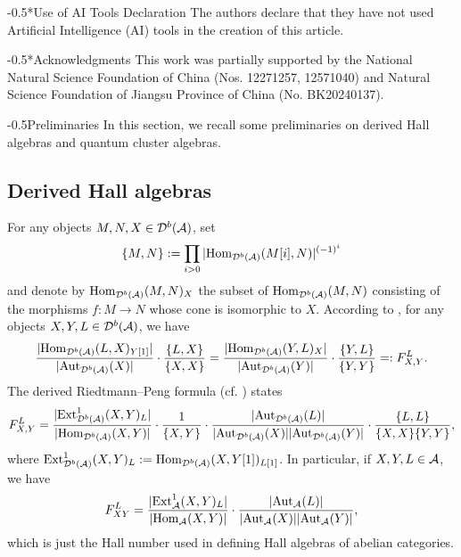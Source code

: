 \documentclass[reqno,12pt]{amsart}
\makeatletter
\numberwithin{equation}{section}
\def\Ext{\mbox{\rm Ext}} \def\Hom{\mbox{\rm Hom}} \def\dim{\mbox{\rm dim}} \def\Iso{\mbox{\rm Iso}\,}\def\Ind{\mbox{\rm Ind}\,}
\theoremstyle{plain} %
\theoremstyle{definition} %
\renewcommand{\section}{\@startsection{section}{1}{0mm}
  {-\baselineskip}{0.5\baselineskip}{\bf\leftline}}
\makeatother
\begin{document}
\section*{Use of AI Tools Declaration}
The authors declare that they have not used Artificial Intelligence (AI) tools in the creation of this article.

\section*{Acknowledgments}
This work was partially supported by the National Natural Science Foundation of China (Nos. 12271257, 12571040) and Natural Science Foundation of Jiangsu Province of China (No. BK20240137).



\section{Preliminaries}
In this section, we recall some preliminaries on derived Hall algebras and quantum cluster algebras.
\subsection{Derived Hall algebras}
For any objects $M,N, X\in \mathcal{D}^b(\mathcal{A})$, set $$\{M,N\}:=\prod\limits_{i>0}|\Hom_{\mathcal{D}^b(\A)}(M[i],N)|^{(-1)^i}$$ and denote by $\Hom_{\mathcal{D}^b(\A)}(M,N)_X$ the subset of $\Hom_{\mathcal{D}^b(\A)}(M,N)$ consisting of the morphisms $f: M\to N$ whose cone is isomorphic to $X$. According to \cite{Toen2006,XiaoXu}, for any objects $X,Y,L\in \mathcal{D}^b(\mathcal{A})$, we have
$$\frac{|\Hom_{\mathcal{D}^b(\A)}(L,X)_{Y[1]}|}{|{\rm Aut}_{\mathcal{D}^b(\A)}(X)|}\cdot\frac{\{L,X\}}{\{X,X\}}=
\frac{|\Hom_{\mathcal{D}^b(\A)}(Y,L)_{X}|}{|{\rm Aut}_{\mathcal{D}^b(\A)}(Y)|}\cdot\frac{\{Y,L\}}{\{Y,Y\}}=:F_{X,Y}^L.$$
The derived Riedtmann--Peng formula (cf. \cite{XiaoXu2,WWZ}) states
\begin{equation*}
F_{X,Y}^L=\frac{|\Ext^1_{\mathcal{D}^b(\A)}(X,Y)_{L}|}{|\Hom_{\mathcal{D}^b(\A)}(X,Y)|}\cdot\frac{1}{\{X,Y\}}\cdot\frac{|{\rm Aut}_{\mathcal{D}^b(\A)}(L)|}{|{\rm Aut}_{\mathcal{D}^b(\A)}(X)||{\rm Aut}_{\mathcal{D}^b(\A)}(Y)|}\cdot\frac{\{L,L\}}{\{X,X\}\{Y,Y\}},
\end{equation*}
where $\Ext^1_{\mathcal{D}^b(\A)}(X,Y)_{L}:=\Hom_{\mathcal{D}^b(\A)}(X,Y[1])_{L[1]}$. In particular, if $X,Y,L\in\mathcal{A}$, we have
$$F_{XY}^{L}=\frac{|\Ext^1_{\A}(X,Y)_{L}|}{|\Hom_{\A}(X,Y)|}\cdot \frac{|{\rm Aut}_{\A}(L)|}{|{\rm Aut}_{\A}(X)||{\rm Aut}_{\A}(Y)|},$$
which is just the Hall number used in defining Hall algebras of abelian categories.
\end{document}
